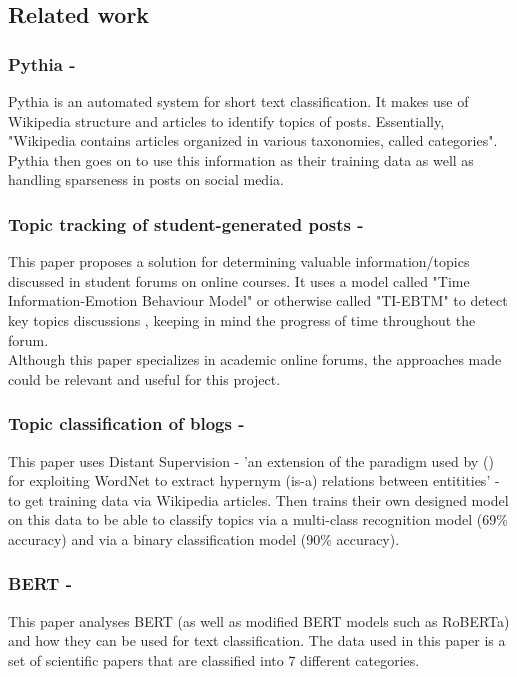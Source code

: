 \subsection{Related work}

\subsubsection{Pythia - \cite{Pythia}}
Pythia is an automated system for short text classification. It makes use of Wikipedia structure and articles to identify
topics of posts.
Essentially, "Wikipedia contains articles organized in various taxonomies, called categories". Pythia then goes on to use
this information as their training data as well as handling sparseness in posts on social media.

\subsubsection{Topic tracking of student-generated posts - \cite{TopicTracking}}
This paper proposes a solution for determining valuable information/topics discussed in student forums on online courses.
It uses a model called "Time Information-Emotion Behaviour Model" or otherwise called "TI-EBTM" to detect key topics discussions
, keeping in mind the progress of time throughout the forum.\\
Although this paper specializes in academic online forums, the approaches made could be relevant and useful for this project.

\subsubsection{Topic classification of blogs - \cite{husby2012topic}}
This paper uses Distant Supervision - 'an extension of the paradigm used by (\cite{snow}) for exploiting WordNet to extract hypernym (is-a) relations between entitities'
- to get training data via Wikipedia articles. Then trains their own designed model on this data to be able to classify topics via a
multi-class recognition model (69\% accuracy) and via a binary classification model (90\% accuracy).

\subsubsection{BERT - \cite{bertmodelling}}
This paper analyses BERT (as well as modified BERT models such as RoBERTa) and how they can be used for text classification.
The data used in this paper is a set of scientific papers that are classified into 7 different categories.\\

